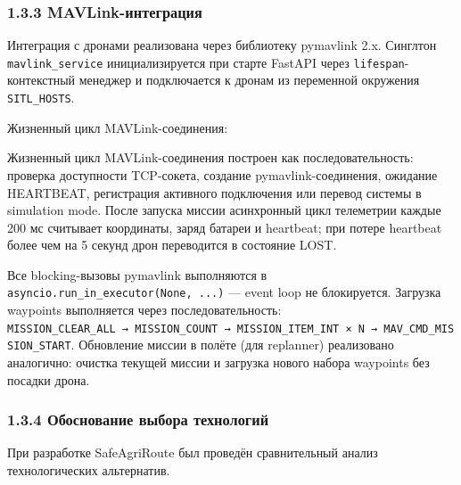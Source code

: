 \documentclass[14pt,a4paper]{extarticle}
\begin{document}
\hypertarget{mavlink-ux438ux43dux442ux435ux433ux440ux430ux446ux438ux44f}{%
\subsubsection{1.3.3 MAVLink-интеграция}\label{mavlink-ux438ux43dux442ux435ux433ux440ux430ux446ux438ux44f}}

Интеграция с дронами реализована через библиотеку pymavlink 2.x. Синглтон \texttt{mavlink\_service} инициализируется при старте FastAPI через \texttt{lifespan}-контекстный менеджер и подключается к дронам из переменной окружения \texttt{SITL\_HOSTS}.

Жизненный цикл MAVLink-соединения:

Жизненный цикл MAVLink-соединения построен как последовательность: проверка доступности TCP-сокета, создание pymavlink-соединения, ожидание HEARTBEAT, регистрация активного подключения или перевод системы в simulation mode. После запуска миссии асинхронный цикл телеметрии каждые 200 мс считывает координаты, заряд батареи и heartbeat; при потере heartbeat более чем на 5 секунд дрон переводится в состояние LOST.


Все blocking-вызовы pymavlink выполняются в \texttt{asyncio.run\_in\_executor(None,\ ...)} --- event loop не блокируется. Загрузка waypoints выполняется через последовательность: \texttt{MISSION\_CLEAR\_ALL\ →\ MISSION\_COUNT\ →\ MISSION\_ITEM\_INT\ ×\ N\ →\ MAV\_CMD\_MISSION\_START}. Обновление миссии в полёте (для replanner) реализовано аналогично: очистка текущей миссии и загрузка нового набора waypoints без посадки дрона.

\hypertarget{ux43eux431ux43eux441ux43dux43eux432ux430ux43dux438ux435-ux432ux44bux431ux43eux440ux430-ux442ux435ux445ux43dux43eux43bux43eux433ux438ux439}{%
\subsubsection{1.3.4 Обоснование выбора технологий}\label{ux43eux431ux43eux441ux43dux43eux432ux430ux43dux438ux435-ux432ux44bux431ux43eux440ux430-ux442ux435ux445ux43dux43eux43bux43eux433ux438ux439}}

При разработке SafeAgriRoute был проведён сравнительный анализ технологических альтернатив.
\end{document}
